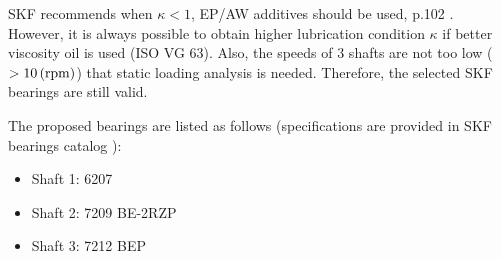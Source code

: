 SKF recommends when $ \kappa < 1 $, EP/AW additives should be used, p.102 \cite{rolling_bearings}. However, it is always possible to obtain higher lubrication condition $ \kappa $ if better viscosity oil is used (ISO VG 63). Also, the speeds of 3 shafts are not too low ($ > 10 \, (\mathrm{rpm}) $) that static loading analysis is needed. Therefore, the selected SKF bearings are still valid.

The proposed bearings are listed as follows (specifications are provided in SKF bearings catalog \cite{rolling_bearings}):
\begin{itemize}
	\item Shaft 1: 6207
	\item Shaft 2: 7209 BE-2RZP
	\item Shaft 3: 7212 BEP
\end{itemize}